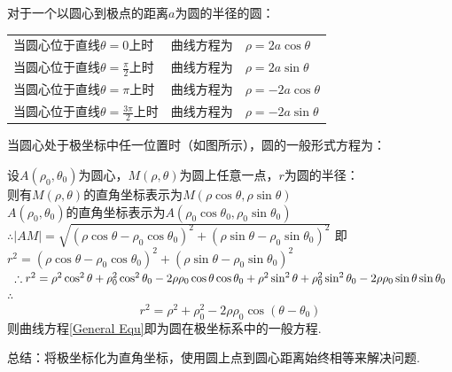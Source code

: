 \documentclass[b4paper,10.5pt]{article}
\begin{document}
对于一个以圆心到极点的距离$a$为圆的半径的圆：\\

\begin{tabular}{lcl}
  当圆心位于直线$\theta=0上时$ & 曲线方程为  & $\rho = 2a\cos \theta $ \\
  当圆心位于直线$\theta=\frac{\pi}{2}$上时 & 曲线方程为 & $\rho=2a\sin\theta $ \\
  当圆心位于直线$\theta=\pi$上时 & 曲线方程为 & $\rho=-2a\cos\theta $ \\
  当圆心位于直线$\theta=\frac{3\pi}{2}$上时 & 曲线方程为 & $\rho=-2a\sin\theta $ \\
\end{tabular}
\bigskip\bigskip

当圆心处于极坐标中任一位置时（如图所示），圆的一般形式方程为：\\

设$A(\rho _{0},\theta _{0})$为圆心，$M(\rho,\theta)$为圆上任意一点，$r$为圆的半径：\\
则有$M(\rho,\theta)$的直角坐标表示为$M(\rho\cos\theta, \rho\sin\theta)$\\
$A(\rho_{0},\theta_{0})$的直角坐标表示为$A(\rho_0\cos\theta_0, \rho_0\sin\theta_0)$
$\therefore |AM|=\sqrt{(\rho\cos\theta-\rho_0\cos\theta_0)^2+(\rho\sin\theta-\rho_0\sin\theta_0)^2}$
即 $r^2=(\rho\cos\theta-\rho_0\cos\theta_0)^2+(\rho\sin\theta-\rho_0\sin\theta_0)^2$
$\therefore r^2=\rho^2\cos^2\theta+\rho_0^2\cos^2\theta_0-2\rho\rho_0\cos\theta\cos\theta_0 \\ +\rho^2\sin^2\theta+\rho_0^2\sin^2\theta_0-2\rho\rho_0\sin\theta\sin\theta_0$
$\therefore$
\begin{equation}\label{General Equ}
    r^2=\rho^2+\rho_0^2-2\rho\rho_0\cos(\theta-\theta_0)
\end{equation}
则曲线方程\ref{General Equ}即为圆在极坐标系中的一般方程.

总结：将极坐标化为直角坐标，使用圆上点到圆心距离始终相等来解决问题.
\end{document}
